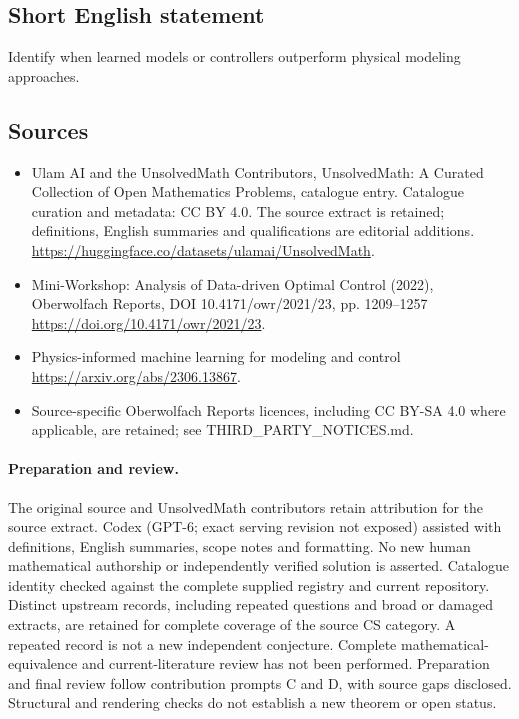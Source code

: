\documentclass[11pt]{article}
\begin{document}
\subsection{Short English statement}
Identify when learned models or controllers outperform physical modeling approaches.
\subsection{Sources}
\begin{itemize}
\item[\hypertarget{source:statement:1}{S1}] Ulam AI and the UnsolvedMath Contributors, UnsolvedMath: A Curated Collection of Open Mathematics Problems, catalogue entry. Catalogue curation and metadata: CC BY 4.0. The source extract is retained; definitions, English summaries and qualifications are editorial additions.
\url{https://huggingface.co/datasets/ulamai/UnsolvedMath}.
\item[\hypertarget{source:statement:2}{S2}] Mini-Workshop: Analysis of Data-driven Optimal Control (2022), Oberwolfach Reports, DOI 10.4171/owr/2021/23, pp. 1209--1257
\url{https://doi.org/10.4171/owr/2021/23}.
\item[\hypertarget{source:statement:3}{S3}] Physics-informed machine learning for modeling and control
\url{https://arxiv.org/abs/2306.13867}.
\item Source-specific Oberwolfach Reports licences, including CC BY-SA 4.0 where applicable, are retained; see THIRD\_PARTY\_NOTICES.md.
\end{itemize}
\paragraph{Preparation and review.}
The original source and UnsolvedMath contributors retain attribution for the source extract. Codex (GPT-6; exact serving revision not exposed) assisted with definitions, English summaries, scope notes and formatting. No new human mathematical authorship or independently verified solution is asserted. Catalogue identity checked against the complete supplied registry and current repository. Distinct upstream records, including repeated questions and broad or damaged extracts, are retained for complete coverage of the source CS category. A repeated record is not a new independent conjecture. Complete mathematical-equivalence and current-literature review has not been performed. Preparation and final review follow contribution prompts C and D, with source gaps disclosed. Structural and rendering checks do not establish a new theorem or open status.
\label{end:statement}
\end{document}

